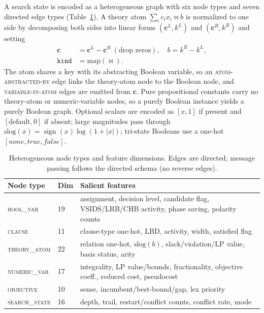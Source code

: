\documentclass[letterpaper]{article} %
\theoremstyle{definition}
\theoremstyle{plain}
\theoremstyle{remark}
\begin{document}
A search state is encoded as a heterogeneous graph with six node types and
seven directed edge types (Table~\ref{tab:nodes}). A theory atom
$\sum_i c_i x_i \bowtie b$ is normalized to one side by decomposing both sides
into linear forms $(\mathbf{c}^L,k^L)$ and $(\mathbf{c}^R,k^R)$ and setting
\begin{equation}
\begin{aligned}
\mathbf{c} &= \mathbf{c}^L-\mathbf{c}^R \ (\text{drop zeros}),\quad
b = k^R-k^L,\\
\texttt{kind} &= \mathrm{map}(\bowtie).
\end{aligned}
\label{eq:linear}
\end{equation}
The atom shares a key with its abstracting Boolean variable, so an
\textsc{atom-abstracted-by} edge links the theory-atom node to the Boolean
node, and \textsc{variable-in-atom} edges are emitted from
$\mathbf{c}$. Pure propositional constants carry no theory-atom or
numeric-variable nodes, so a purely Boolean instance yields a purely Boolean
graph. Optional scalars are encoded as $[x,1]$ if present and
$[\text{default},0]$ if absent; large magnitudes pass through
$\mathrm{slog}(x)=\operatorname{sign}(x)\log(1+|x|)$; tri-state Booleans use a
one-hot $[\textit{none},\textit{true},\textit{false}]$.

\begin{table}[t]
\centering
\small
\begin{tabular}{@{}llp{3.9cm}@{}}
\toprule
Node type & Dim & Salient features \\
\midrule
\textsc{bool\_var}     & 19 & assignment, decision level, candidate flag, VSIDS/LRB/CHB activity, phase saving, polarity counts \\
\textsc{clause}        & 11 & clause-type one-hot, LBD, activity, width, satisfied flag \\
\textsc{theory\_atom}  & 22 & relation one-hot, $\mathrm{slog}(b)$, slack/violation/LP value, basis status, arity \\
\textsc{numeric\_var}  & 17 & integrality, LP value/bounds, fractionality, objective coeff., reduced cost, pseudocost \\
\textsc{objective}     & 10 & sense, incumbent/best-bound/gap, lex priority \\
\textsc{search\_state} & 16 & depth, trail, restart/conflict counts, conflict rate, mode \\
\bottomrule
\end{tabular}
\caption{Heterogeneous node types and feature dimensions. Edges are
directed; message passing follows the directed schema (no reverse edges).}
\label{tab:nodes}
\end{table}
\end{document}
